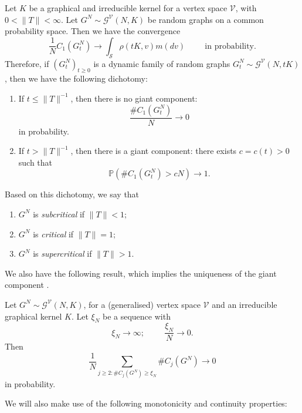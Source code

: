    \begin{theorem}\label{thrm: RG1} Let $K$ be a graphical and irreducible kernel for a vertex space $\mathcal{V}$, with $0<\|T\|< \infty.$ Let $G^N\sim \mathcal{G}^\mathcal{V}(N, K)$ be random graphs on a common probability space. Then we have the convergence \begin{equation}
       \frac{1}{N}C_1(G^N_t)\rightarrow \int_{\mathcal{S}} \rho(tK, v) m(dv) \hspace{1cm} \text{in probability.}
   \end{equation}
   Therefore, if $(G^N_t)_{t\geq 0}$ is a dynamic family of random graphs $
       G^N_t \sim \mathcal{G}^\mathcal{V}(N, tK)$, then we have the following dichotomy:  \begin{enumerate}[label=\roman{*}).]
       \item If $t\leq \|T\|^{-1}$, then there is no giant component: \begin{equation}
           \frac{\#C_1(G^N_t)}{N} \rightarrow 0
       \end{equation} in probability.
       \item If $t>\|T\|^{-1}$, then there is a giant component: there exists $c=c(t)>0$ such that
       \begin{equation}
           \mathbb{P}(\#C_1(G^N_t)>cN)\rightarrow 1.
       \end{equation}
   \end{enumerate}\end{theorem}
   \begin{remark} Based on this dichotomy, we say that \begin{enumerate}[label=\roman{*}).]
       \item $G^N$ is \emph{subcritical} if $\|T\|<1;$
       \item $G^N$ is \emph{critical} if $\|T\|=1;$
       \item $G^N$ is \emph{supercritical} if $\|T\|>1.$
   \end{enumerate} \end{remark} We also have the following result, which implies the uniqueness of the giant component \cite[Theorem 3.6]{BJR07}.
   \begin{theorem}\label{thrm: RG2} Let $G^N\sim \mathcal{G}^\mathcal{V}(N, K)$, for a (generalised) vertex space $\mathcal{V}$ and an irreducible graphical kernel $K$. Let $\xi_N$ be a sequence with  \begin{equation}
       \xi_N\rightarrow \infty; \hspace{1cm} \frac{\xi_N}{N}\rightarrow 0.
   \end{equation} Then \begin{equation}
       \frac{1}{N}\sum_{j\geq 2: \#C_j(G^N)\geq \xi_N}\#C_j(G^N) \rightarrow 0
   \end{equation} in probability. \end{theorem}   We will also make use of the following monotonicity and continuity properties: \cite[Theorem 6.4]{BJR07}
